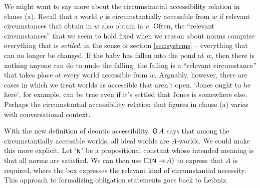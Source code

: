 We might want to say more about the circumstantial accessibility relation in
clause (a). Recall that a world $v$ is circumstantially accessible from $w$ if
relevant circumstances that obtain in $w$ also obtain in $v$. Often, the
``relevant circumstances'' that we seem to hold fixed when we reason about norms
comprise everything that is \emph{settled}, in the sense of section
\ref{sec:systems} -- everything that can no longer be changed. If the baby has
fallen into the pond at $w$, then there is nothing anyone can do to undo the
falling; the falling is a ``relevant circumstance'' that takes place at every
world accessible from $w$. Arguably, however, there are cases in which we treat
worlds as accessible that aren't open. `Jones ought to be here', for example,
can be true even if it's settled that Jones is somewhere else. Perhaps the
circumstantial accessibility relation that figures in clause (a) varies with
conversational context.




With the new definition of deontic accessibility, $\operatorname{\mathsf{O}} A$ says that among the
circumstantially accessible worlds, all ideal worlds are $A$-worlds. We could
make this more explicit. Let `$\OK$' be a propositional constant whose intended
meaning is that all norms are satisfied. We can then use $\Box (\OK \to A)$ to
express that $A$ is required, where the box expresses the relevant kind of
circumstantial necessity. This approach to formalizing obligation statements
goes back to Leibniz.


